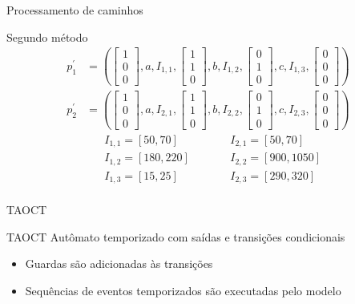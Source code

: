 \documentclass[xcolor=x11names,compress,framenumber]{beamer}
\newcommand{\colvector}[3]{\left[ \begin{array}{c}
		#1 \\ #2 \\ #3
	\end{array}\right]}
\renewcommand{\(}{\begin{columns}}
\renewcommand{\)}{\end{columns}}
\newcommand{\<}[1]{\begin{column}{#1}}
\renewcommand{\>}{\end{column}}
\begin{document}
\begin{frame}{Processamento de caminhos}
\begin{block}{Segundo método}
	\begin{align*}
	p^\prime_1\! &=\! \left( \colvector{1}{0}{0},a,I_{1,1},\colvector{1}{1}{0},b,I_{1,2},\colvector{0}{1}{0},c,I_{1,3},\colvector{0}{0}{0}\right) \\
	p^\prime_2\! &=\! \left( \colvector{1}{0}{0},a,I_{2,1},\colvector{1}{1}{0},b,I_{2,2},\colvector{0}{1}{0},c,I_{2,3},\colvector{0}{0}{0}\right)
	\end{align*}
	\begin{equation*}
	\begin{split}
	&  I_{1,1} = [50,70] \\
	&  I_{1,2} = [180,220] \\
	&  I_{1,3} = [15,25]  \\
	\end{split}
	\quad\quad
	\begin{split}
	& I_{2,1} = [50,70] \\
	& I_{2,2} = [900,1050] \\
	& I_{2,3} = [290,320] \\
	\end{split}
	\end{equation*}
\end{block}
\end{frame}

\begin{frame}{TAOCT}
	\begin{block}{TAOCT}
		Autômato temporizado com saídas e transições condicionais
	\end{block}
	\begin{block}{}
		\begin{itemize}
			\item Guardas são adicionadas às transições
			\item Sequências de eventos temporizados são executadas pelo modelo
		\end{itemize}
	\end{block}
\end{frame}
\end{document}
